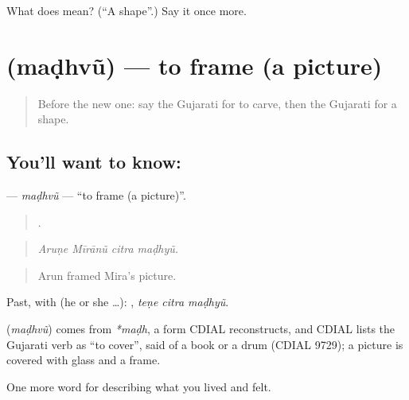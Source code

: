 \begin{tcolorbox}[breakable,colback=teal!4,colframe=teal!35!black,title={Before you move on}]
What does  mean? (\textquotedblleft{}A shape\textquotedblright{}.) Say it once more.
\end{tcolorbox}
\section[\texorpdfstring{\gu{મઢવું} (maḍhvũ)}{મઢવું (maḍhvũ)}]{ (maḍhvũ) — to frame (a picture)}

\label{lesson:GU-C525-madhvu}



\begin{quote}
Before the new one: say the Gujarati for to carve, then the Gujarati for a shape.
\end{quote}

\subsection*{You'll want to know: }
\textbf{} — \emph{maḍhvũ} — \textquotedblleft{}to frame (a picture)\textquotedblright{}.

\begin{quote}
   .
\end{quote}

\begin{quote}
\emph{Aruṇe Mīrānũ citra maḍhyũ.}
\end{quote}

\begin{quote}
Arun framed Mira's picture.
\end{quote}

Past, with  (he or she …):   , \emph{teṇe citra maḍhyũ}.

\begin{cousinweb}
\textbf{} (\emph{maḍhvũ}) comes from \emph{*maḍh}, a form CDIAL reconstructs, and CDIAL lists the Gujarati verb as \textquotedblleft{}to cover\textquotedblright{}, said of a book or a drum (CDIAL 9729); a picture is covered with glass and a frame.
\end{cousinweb}

\begin{grammarlens}[title={What you've built}]
One more word for describing what you lived and felt.
\end{grammarlens}


